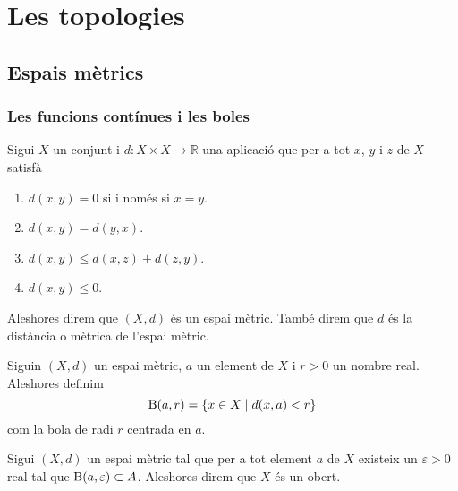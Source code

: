 \documentclass[../Apunts.tex]{subfiles}
\begin{document}
\chapter{Les topologies}
	\section{Espais mètrics}
	\subsection{Les funcions contínues i les boles}
	\begin{definition}
		\label{def:espai mètric}
		\label{def:distància}
		Sigui \(X\) un conjunt i \(d\colon X\times X\longrightarrow\mathbb{R}\) una aplicació que per a tot \(x\), \(y\) i \(z\) de \(X\) satisfà
		\begin{enumerate}
			\item \(d(x,y)=0\) si i només si \(x=y\).
			\item \(d(x,y)=d(y,x)\).
			\item \(d(x,y)\leq d(x,z)+d(z,y)\).
			\item \(d(x,y)\leq0\).
		\end{enumerate}
		Aleshores direm que \((X,d)\) és un espai mètric. També direm que \(d\) és la distància o mètrica de l'espai mètric.
	\end{definition}
	\begin{definition}[Bola]
		\label{def:bola}
		Siguin \((X,d)\) un espai mètric, \(a\) un element de \(X\) i \(r>0\) un nombre real. Aleshores definim
		\[\operatorname{B}(a,r)=\{x\in X\mid d(x,a)<r\}\]
		com la bola de radi \(r\) centrada en \(a\).
	\end{definition}
	\begin{definition}[Obert]
		\label{def:obert}
		Sigui \((X,d)\) un espai mètric tal que per a tot element \(a\) de \(X\) existeix un \(\varepsilon>0\) real tal que \(\operatorname{B}(a,\varepsilon)\subset A\). Aleshores direm que \(X\) és un obert.
	\end{definition}
\end{document}

